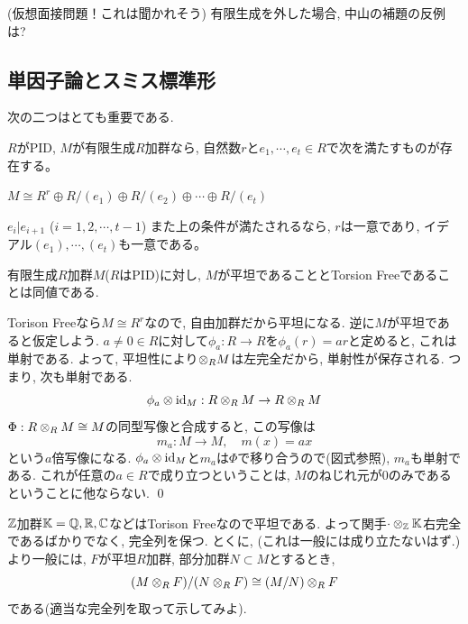 \begin{prac} (仮想面接問題！これは聞かれそう)
有限生成を外した場合, 中山の補題の反例は?
\end{prac}













\subsection{単因子論とスミス標準形}
次の二つはとても重要である.
\begin{theo}
$R$がPID, $M$が有限生成$R$加群なら, 自然数$r$と$e_1,\cdots, e_t\in R$で次を満たすものが存在する。
\ben
\item $M\cong R^{r} \oplus R/(e_1) \oplus R/(e_2) \oplus \cdots \oplus R/(e_t)$
\item $e_i | e_{i+1}$ ($i=1,2,\cdots, t-1$)
\een
また上の条件が満たされるなら, $r$は一意であり, イデアル$(e_1),\cdots, (e_t)$も一意である。
\end{theo}

\begin{cor}
有限生成$R$加群$M$($R$はPID)に対し, $M$が平坦であることとTorsion Freeであることは同値である.
\end{cor}
\prf Torison Freeなら$M \cong R^r$なので, 自由加群だから平坦になる. 逆に$M$が平坦であると仮定しよう. $a\neq 0 \in R$に対して$\phi_a: R\to R$を$\phi_{a}(r) = ar$と定めると, これは単射である. よって, 平坦性により$\mathbin{\otimes}_{R}M$は左完全だから, 単射性が保存される. つまり, 次も単射である.
\[\phi_{a} \mathbin{\otimes} \mathrm{id}_{M} : R\mathbin{\otimes}_{R} M \to R\mathbin{\otimes}_{R} M\]
$\Phi: R\mathbin{\otimes}_{R} M \cong M$の同型写像と合成すると, この写像は
\[m_{a}: M\to M,\quad m(x) = ax\]
という$a$倍写像になる. $\phi_{a}\mathbin{\otimes} \mathrm{id}_{M}$と$m_a$は$\Phi$で移り合うので(図式参照), $m_a$も単射である. これが任意の$a\in R$で成り立つということは, $M$のねじれ元が$0$のみであるということに他ならない. \qed

\begin{eg}
$\mathbb{Z}$加群$\mathbb{K} = \mathbb{Q}, \mathbb{R}, \mathbb{C}$などはTorison Freeなので平坦である. よって関手$\cdot  \mathbin{\otimes}_{\mathbb{Z}} \mathbb{K}$右完全であるばかりでなく, 完全列を保つ. とくに, (これは一般には成り立たないはず.) より一般には, $F$が平坦$R$加群, 部分加群$N\subset M$とするとき,
\[(M\mathbin{\otimes}_{R} F)/(N\mathbin{\otimes}_{R} F) \cong (M/N)\mathbin{\otimes}_{R} F \]
である(適当な完全列を取って示してみよ).
\end{eg}

